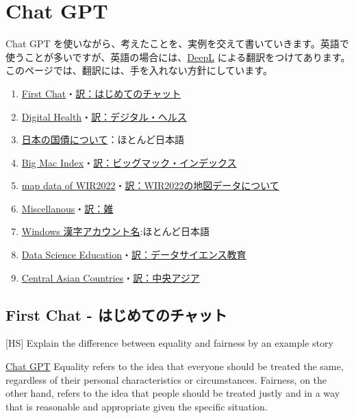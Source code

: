 \documentclass[
]{bxjsbook}
\providecommand{\tightlist}{%
  \setlength{\itemsep}{0pt}\setlength{\parskip}{0pt}}
\theoremstyle{definition}
\theoremstyle{definition}
\theoremstyle{definition}
\theoremstyle{definition}
\theoremstyle{remark}
\begin{document}
\hypertarget{chatgpt}{%
\section{Chat GPT}\label{chatgpt}}

Chat GPT を使いながら、考えたことを、実例を交えて書いていきます。英語で使うことが多いですが、英語の場合には、\href{https://www.deepl.com/translator}{DeepL} による翻訳をつけてあります。このページでは、翻訳には、手を入れない方針にしています。

\begin{enumerate}
\def\labelenumi{\arabic{enumi}.}
\tightlist
\item
  \protect\hyperlink{firstchat}{First Chat}・\protect\hyperlink{firstchatj}{訳：はじめてのチャット}
\item
  \protect\hyperlink{digitalhealth}{Digital Health}・\protect\hyperlink{digitalhealthj}{訳：デジタル・ヘルス}
\item
  \protect\hyperlink{nationalbond}{日本の国債について}：ほとんど日本語
\item
  \protect\hyperlink{bigmacindex}{Big Mac Index}・\protect\hyperlink{bigmacindexj}{訳：ビッグマック・インデックス}
\item
  \protect\hyperlink{mapdataofwir2022}{map data of WIR2022}・\protect\hyperlink{mapdataofwir2022j}{訳：WIR2022の地図データについて}
\item
  \protect\hyperlink{miscellanous}{Miscellanous}・\protect\hyperlink{miscellanousj}{訳：雑}
\item
  \protect\hyperlink{windowsaccount}{Windows 漢字アカウント名}:ほとんど日本語
\item
  \protect\hyperlink{dseducation}{Data Science Education}・\protect\hyperlink{dseducationj}{訳：データサイエンス教育}
\item
  \protect\hyperlink{centralasia}{Central Asian Countries}・\protect\hyperlink{centralasiaj}{訳：中央アジア}
\end{enumerate}

\hypertarget{firstchat}{%
\subsection{First Chat - はじめてのチャット　}\label{firstchat}}

{[}HS{]} Explain the difference between equality and fairness by an example story

\protect\hyperlink{chatgpt}{Chat GPT} Equality refers to the idea that everyone should be treated the same, regardless of their personal characteristics or circumstances. Fairness, on the other hand, refers to the idea that people should be treated justly and in a way that is reasonable and appropriate given the specific situation.
\end{document}
